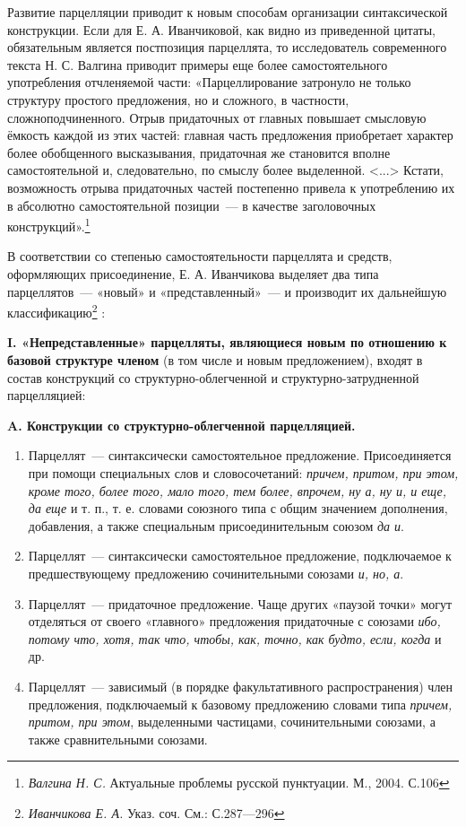 \documentclass{kursa4}
\begin{document}
{{      {Развитие парцелляции приводит к новым способам
      организации синтаксической конструкции. Если для Е. А. Иванчиковой, как
      видно из приведенной цитаты, обязательным является постпозиция
      парцеллята, то исследователь современного текста Н. С. Валгина приводит
      примеры еще более самостоятельного употребления отчленяемой части:
      «Парцеллирование затронуло не только структуру простого предложения, но
      и сложного, в частности, сложноподчиненного. Отрыв придаточных от
      главных повышает смысловую ёмкость каждой из этих частей: главная часть
      предложения }{приобретает характер более
      обо}{б}{щенного высказывания,
      придаточная же становится вполне самостоятельной и, следовательно, по
      смыслу более выделенной. \textless{}...\textgreater{} Кстати,
      возможность отрыва придаточных частей постепенно привела к употреблению
      их в абсолютно самостоятельной позиции~--- в качестве заголовочных
      конструкций».}\footnote{\textit{{ Валгина Н. С.
      }}{Актуальные проблемы русской пунктуации. М., 2004.
      С.106}}{ }

      {В соответствии со степенью самостоятельности
      парцеллята и средств, оформляющих присоединение, Е. А. Иванчикова
      выделяет два типа парцеллятов~--- «новый» и «представленный»~--- и
      производит их дальнейшую
      классификацию}\footnote{\textit{{Иванчикова Е. А.
      }}{Указ. соч. См.: С.287—296}}{ :}

      \textbf{I. «Непредставленные» парцелляты, являющиеся
      новым по отношению к базовой структуре членом} (в том числе и
      новым предложением), входят в состав конструкций со
      структурно-облегченной и структурно-затрудненной парцелляцией:

      {\centering
      \textbf{A. Конструкции со структурно-облегченной
      парцелляцией.}}
      \begin{enumerate}
        \item Парцеллят~--- синтаксически самостоятельное
        предложение. Присоединяется при помощи специальных слов и
        словосочетаний: \textit{причем, притом, при этом,
        кроме того, более того, мало того, тем более, впрочем, ну а, ну и, и
        еще, да еще} и т. п., т. е. словами союзного типа с общим значением дополнения, добавления, а также специальным присоединительным союзом \textit{да и}.
        \item Парцеллят~--- синтаксически самостоятельное
        предложение, подключаемое к предшествующему предложению сочинительными
        союзами \textit{и, но, а}.
        \item Парцеллят~--- придаточное предложение. Чаще других
        «паузой точки» могут отделяться от своего «главного» предложения
        придаточные с союзами \textit{ибо, потому что, хотя,
        так что, чтобы, как, точно, как будто, если, когда}
        и др.
        \item Парцеллят~--- зависимый (в порядке факультативного распространения) член предложения, подключаемый к
        базовому предложению словами типа \textit{причем,
        притом, при этом}, выделенными частицами,
        сочинительными союзами, а также сравнительными союзами.
      \end{enumerate}

}}
\end{document}
